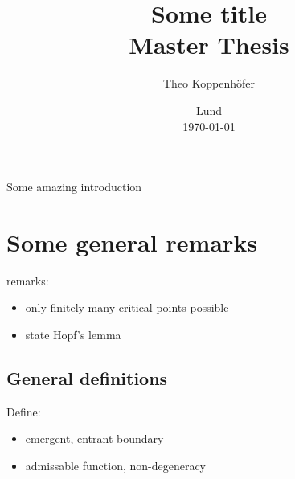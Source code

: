 




\title{ Some title \\[1ex]
	  \large Master Thesis}
\author{Theo Koppenhöfer}
\date{Lund \\[1ex] \today}



\usepackage{pythonhighlight}
\usepackage{pgfplots}
\graphicspath{{../Plots/}}
\graphicspath{{../Figures/}}


\newcommand{\bx}{\bar{x}}





\maketitle

Some amazing introduction
 
\newpage

\section*{Some general remarks}

remarks:
\begin{itemize}
  \item only finitely many critical points possible
  \item state Hopf's lemma
\end{itemize}

\subsection*{General definitions}

Define:
\begin{itemize}
  \item emergent, entrant boundary
  \item admissable function, non-degeneracy
\end{itemize}

